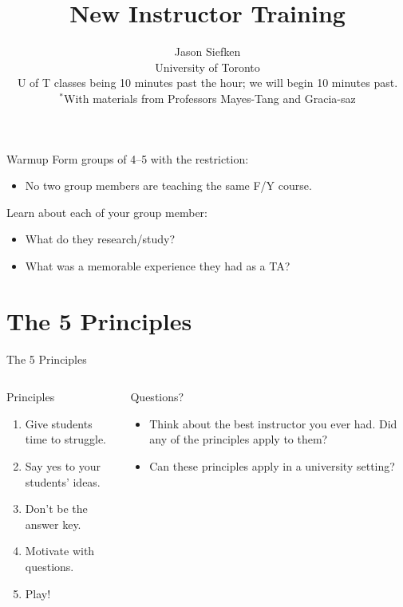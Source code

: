 \documentclass[10pt, aspectratio=169, t]{beamer}
\title{New Instructor Training}
\subtitle{}
\author{{\large Jason Siefken}\\
University of Toronto\\[1cm]
\textcolor{mLightBrown}{U of T classes being 10 minutes past the hour; we will begin 10 minutes past.}\\[2cm]$^*$With materials from Professors Mayes-Tang and Gracia-saz}
\date{}
\begin{document}

\maketitle


%
\begin{frame}{Warmup}
	Form groups of 4--5 with the restriction:
	\begin{itemize}
		\item No two group members are teaching the same F/Y course.
	\end{itemize}

	Learn about each of your group member:
	\begin{itemize}
		\item What do they research/study?
		\item What was a memorable experience they had as a TA?
	\end{itemize}
\end{frame}

\section{The 5 Principles}
\begin{frame}{The 5 Principles}
\begin{columns}
\begin{column}{0.5\textwidth}
	\begin{block}{Principles}
		\begin{enumerate}
			\item Give students time to struggle.
			\item Say yes to your students' ideas.
			\item Don't be the answer key.
			\item Motivate with questions.
			\item Play!
		\end{enumerate}
		\begin{center}
		\end{center}
	\end{block}
\end{column}
\begin{column}{0.5\textwidth}  %
	\begin{block}{Questions?}
		\begin{itemize}
			\item Think about the best instructor you ever had. Did any of the principles apply to them?
			\item Can these principles apply in a university setting?
		\end{itemize}
	\end{block}
\end{column}
\end{columns}
\end{frame}
\end{document}
